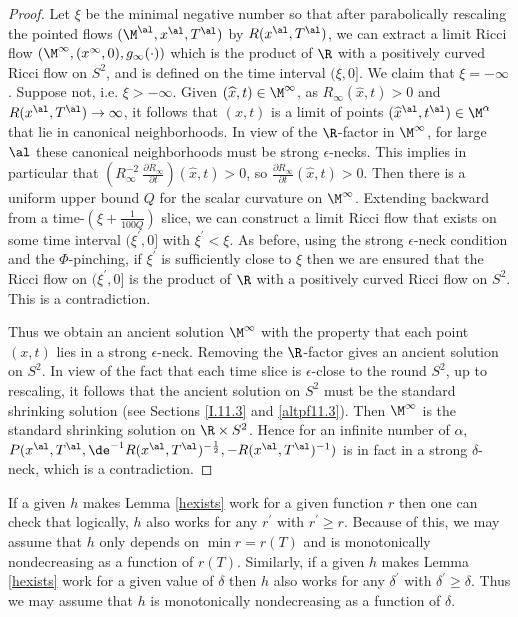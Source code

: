 \begin{proof}
Let $\xi$ be the minimal negative number so that after parabolically rescaling
the pointed flows
$(\M^\al,x^\al,T^\al)$ by $R(x^\al,T^\al)$, we can extract a limit
Ricci flow $(\M^\infty, (x^\infty,0), g_\infty(\cdot))$ which is the product of $\R$ with
a positively curved Ricci flow on $S^2$, and is defined on the
time interval $(\xi, 0]$.  We claim that $\xi =  - \infty$. Suppose
not, i.e. $\xi > - \infty$. Given $(\widehat{x}, t) \in \M^\infty$,
as $R_\infty(\widehat{x}, t) > 0$ and
$R(x^\al,T^\al) \rightarrow \infty$, it follows that
$(x, t)$ is a limit of points $(\widehat{x}^\al, t^\al) \in \M^\alpha$
that lie in canonical
neighborhoods.  In view of the $\R$-factor in $\M^\infty$,
for large $\al$ these
canonical neighborhoods must be strong $\epsilon$-necks.
This implies in particular that
$\left( R_\infty^{-2} \: \frac{\partial R_\infty}{\partial t}\right)
(\widehat{x},t) > 0$, so
$\frac{\partial R_\infty}{\partial t}(\widehat{x},t) > 0$.
Then there
is a uniform upper bound $Q$ for the scalar curvature on $\M^\infty$.
Extending  backward from a time-$(\xi + \frac{1}{100Q})$ slice,
we can construct a limit Ricci flow that exists on some time interval
$(\xi^\prime, 0]$ with $\xi^\prime < \xi$. As before, using the
strong $\epsilon$-neck condition and the $\Phi$-pinching, if
$\xi^\prime$ is sufficiently close to $\xi$ then we are ensured
that the Ricci flow on $(\xi^\prime, 0]$ is the product of $\R$
with a positively curved Ricci flow on $S^2$. This is a contradiction.

Thus we obtain an ancient solution $\M^\infty$
with the property that each point
$(x, t)$ lies in a strong $\epsilon$-neck. Removing the $\R$-factor gives an
ancient solution on $S^2$. In view of the fact that each time slice is
$\epsilon$-close to the round $S^2$, up to rescaling, it follows that
the ancient solution on $S^2$ must be the standard shrinking
solution (see Sections \ref{I.11.3} and \ref{altpf11.3}).
Then $\M^\infty$ is the standard shrinking solution
on $\R \times S^2$. Hence for an infinite number of
$\alpha$,  $P(x^\al,T^\al,\de^{-1}R(x^\al,T^\al)^{-\frac12},
-R(x^\al,T^\al)^{-1})$ is in fact in a strong $\delta$-neck, which is a
contradiction.
\end{proof}

 \begin{remark}
  \label{rem:kl-necks-horns-monotonicity-neck-geometry}

If a given $h$ makes Lemma \ref{hexists} work for a given function $r$ then
one can check that logically, $h$ also works for any $r^\prime$
with $r^\prime \ge r$. Because of this, we may assume that $h$ only
depends on $\min r=r(T)$ and is monotonically nondecreasing as a
function of $r(T)$. Similarly, if a given $h$ makes Lemma \ref{hexists}
work for a given value of $\delta$ then $h$ also works for any
$\delta^\prime$ with $\delta^\prime  \ge\delta$.  Thus we may assume
that $h$ is monotonically nondecreasing as a function of $\delta$.
\end{remark}

